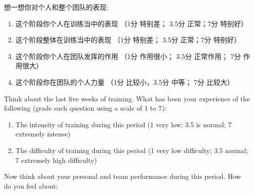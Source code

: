 \begin{CJK}{UTF8}{gbsn}
    想一想你对个人和整个团队的表现:

    \begin{enumerate}
    \item 这个阶段你个人在训练当中的表现 （1分 特别差； 3.5分 正常；7分 特别好）
    \item 这个阶段整体在训练当中的表现 （1分 特别差； 3.5分 正常；7分 特别好）
    \item 这个阶段你个人在团队发挥的作用 （1分 作用很小； 3.5分 正常作用； 7分 作用很大）
    \item 这个阶段你在团队的个人力量 （1分 比较小，3.5分 中等； 7分 比较大）
    \end{enumerate}


Think about the last five weeks of training.  What has been your experience of the following (grade each question using a scale of 1 to 7):

\begin{enumerate}
\item The intensity of training during this period (1 very low; 3.5 is normal; 7 extremely intense)
\item The difficulty of training during this period (1 very low difficulty; 3.5 normal; 7 extremely high difficulty)
\end{enumerate}

Now think about your personal and team performance during this period.  How do you feel about:


\end{CJK}
